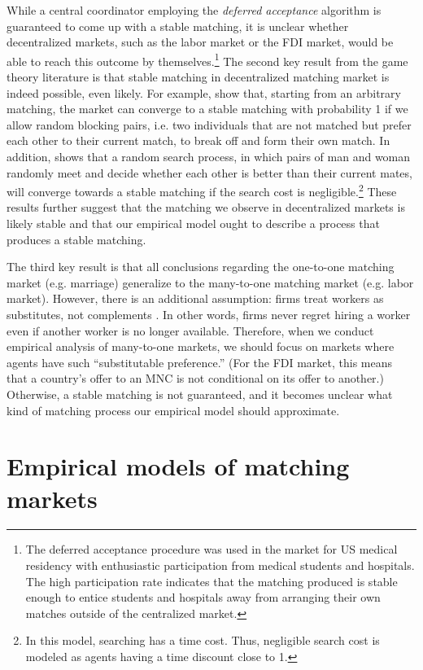 While a central coordinator employing the \textit{deferred acceptance} algorithm
is guaranteed to come up with a stable matching, it is unclear whether
decentralized markets, such as the labor market or the FDI market, would be able
to reach this outcome by themselves.\footnote{The deferred acceptance procedure
  was used in the market for US medical residency with enthusiastic
  participation from medical students and hospitals. The high participation rate
  indicates that the matching produced is stable enough to entice students and
  hospitals away from arranging their own matches outside of the centralized
  market.} The second key result from the game theory literature is that stable
matching in decentralized matching market is indeed possible, even likely. For
example, \citet{Roth2016} show that, starting from an arbitrary matching, the
market can converge to a stable matching with probability 1 if we allow random
blocking pairs, i.e. two individuals that are not matched but prefer each other
to their current match, to break off and form their own match. In addition,
\citet{Adachi2003} shows that a random search process, in which pairs of man and
woman randomly meet and decide whether each other is better than their current
mates, will converge towards a stable matching if the search cost is
negligible.\footnote{In this model, searching has a time cost. Thus, negligible
  search cost is modeled as agents having a time discount close to 1.} These
results further suggest that the matching we observe in decentralized markets is
likely stable and that our empirical model ought to describe a process that
produces a stable matching.

The third key result is that all conclusions regarding the one-to-one matching
market (e.g. marriage) generalize to the many-to-one matching market (e.g. labor
market). However, there is an additional assumption: firms treat workers as
substitutes, not complements \citep{Roth1992}. In other words, firms never
regret hiring a worker even if another worker is no longer available. Therefore,
when we conduct empirical analysis of many-to-one markets, we should focus on
markets where agents have such ``substitutable preference.'' (For the FDI
market, this means that a country's offer to an MNC is not conditional on its
offer to another.) Otherwise, a stable matching is not guaranteed, and it
becomes unclear what kind of matching process our empirical model should
approximate.

\section{Empirical models of matching markets}

